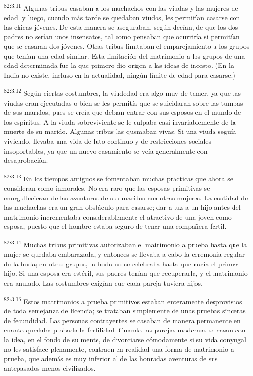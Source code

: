 \documentclass[twoside, 11pt]{book}
\begin{document}
\par
\textsuperscript{82:3.11} Algunas tribus casaban a los muchachos con las viudas y las mujeres de edad, y luego, cuando más tarde se quedaban viudos, les permitían casarse con las chicas jóvenes. De esta manera se aseguraban, según decían, de que los dos padres no serían unos insensatos, tal como pensaban que ocurriría si permitían que se casaran dos jóvenes. Otras tribus limitaban el emparejamiento a los grupos que tenían una edad similar. Esta limitación del matrimonio a los grupos de una edad determinada fue la que primero dio origen a las ideas de incesto. (En la India no existe, incluso en la actualidad, ningún límite de edad para casarse.)

\par
\textsuperscript{82:3.12} Según ciertas costumbres, la viudedad era algo muy de temer, ya que las viudas eran ejecutadas o bien se les permitía que se suicidaran sobre las tumbas de sus maridos, pues se creía que debían entrar con sus esposos en el mundo de los espíritus. A la viuda sobreviviente se le culpaba casi invariablemente de la muerte de su marido. Algunas tribus las quemaban vivas. Si una viuda seguía viviendo, llevaba una vida de luto continuo y de restricciones sociales insoportables, ya que un nuevo casamiento se veía generalmente con desaprobación.

\par
\textsuperscript{82:3.13} En los tiempos antiguos se fomentaban muchas prácticas que ahora se consideran como inmorales. No era raro que las esposas primitivas se enorgullecieran de las aventuras de sus maridos con otras mujeres. La castidad de las muchachas era un gran obstáculo para casarse; dar a luz a un hijo antes del matrimonio incrementaba considerablemente el atractivo de una joven como esposa, puesto que el hombre estaba seguro de tener una compañera fértil.

\par
\textsuperscript{82:3.14} Muchas tribus primitivas autorizaban el matrimonio a prueba hasta que la mujer se quedaba embarazada, y entonces se llevaba a cabo la ceremonia regular de la boda; en otros grupos, la boda no se celebraba hasta que nacía el primer hijo. Si una esposa era estéril, sus padres tenían que recuperarla, y el matrimonio era anulado. Las costumbres exigían que cada pareja tuviera hijos.

\par
\textsuperscript{82:3.15} Estos matrimonios a prueba primitivos estaban enteramente desprovistos de toda semejanza de licencia; se trataban simplemente de unas pruebas sinceras de fecundidad. Las personas contrayentes se casaban de manera permanente en cuanto quedaba probada la fertilidad. Cuando las parejas modernas se casan con la idea, en el fondo de su mente, de divorciarse cómodamente si su vida conyugal no les satisface plenamente, contraen en realidad una forma de matrimonio a prueba, que además es muy inferior al de las honradas aventuras de sus antepasados menos civilizados.
\end{document}

